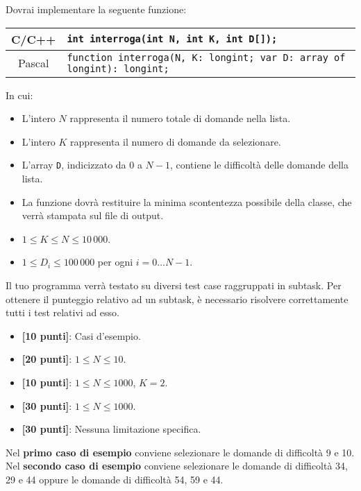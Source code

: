 Dovrai implementare la seguente funzione:
\begin{center}\begin{tabularx}{\textwidth}{|c|X|}
\hline
C/C++  & \verb|int interroga(int N, int K, int D[]);|\\
\hline
Pascal & \verb|function interroga(N, K: longint; var D: array of longint): longint;|\\
\hline
\end{tabularx}\end{center}
In cui:
\begin{itemize}[nolistsep]
  \item L'intero $N$ rappresenta il numero totale di domande nella lista.
  \item L'intero $K$ rappresenta il numero di domande da selezionare.
  \item L'array \texttt{D}, indicizzato da $0$ a $N-1$, contiene le difficoltà delle domande della lista.
  \item La funzione dovrà restituire la minima scontentezza possibile della classe, che verrà stampata sul file di output.
\end{itemize}

\Constraints 
\begin{itemize}[nolistsep,itemsep=2mm]
  \item $1 \le K \le N \le 10\,000$.
  \item $1 \le D_i \le 100\,000$ per ogni $i=0\ldots N-1$.
\end{itemize}

\Scoring
Il tuo programma verrà testato su diversi test case raggruppati in subtask.
Per ottenere il punteggio relativo ad un subtask, è necessario risolvere
correttamente tutti i test relativi ad esso.

\begin{itemize}[nolistsep,itemsep=2mm]
  \item \textbf{ [10 punti]}: Casi d'esempio.
  \item \textbf{ [20 punti]}: $1\le N \le 10$.
  \item \textbf{ [10 punti]}: $1 \le N \le 1000$, $K = 2$.
  \item \textbf{ [30 punti]}: $1 \le N \le 1000$.
  \item \textbf{ [30 punti]}: Nessuna limitazione specifica.
\end{itemize}

\Examples
\begin{example}
%
\end{example}
\begin{example}
%
\end{example}


\Explanation
Nel \textbf{primo caso di esempio} conviene selezionare le domande di difficoltà 9 e 10.\\[2mm]
Nel \textbf{secondo caso di esempio} conviene selezionare le domande di difficoltà 34, 29 e 44 oppure le domande di difficoltà 54, 59 e 44.
